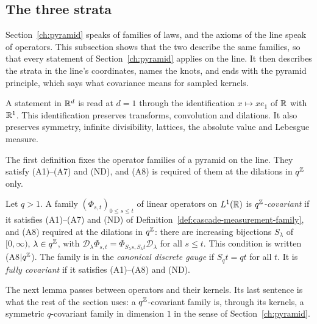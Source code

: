 \subsection{The three strata}
\label{subsec:line-strata}

Section~\ref{ch:pyramid} speaks of families of laws, and the axioms of the line speak of operators.
This subsection shows that the two describe the same families, so that every statement of
Section~\ref{ch:pyramid} applies on the line. It then describes the strata in the line's \Levy{}
coordinates, names the knots, and ends with the pyramid principle, which says what covariance means
for sampled kernels.

A statement in $\mathbb{R}^d$ is read at $d = 1$ through the identification $x \mapsto xe_1$ of $\mathbb{R}$ with
$\mathbb{R}^1$. This identification preserves transforms, convolution and dilations. It also preserves
symmetry, infinite divisibility, lattices, the absolute value and Lebesgue measure.

The first definition fixes the operator families of a pyramid on the line. They satisfy (A1)--(A7)
and (ND), and (A8) is required of them at the dilations in $q^{\mathbb{Z}}$ only.

\begin{definition}
\label{def:q-covariant-line}

Let $q > 1$. A family $(\Phi_{s,t})_{0 \le s \le t}$ of linear operators on $L^1(\mathbb{R})$ is
\emph{$q^{\mathbb{Z}}$-covariant} if it satisfies (A1)--(A7) and (ND) of
Definition~\ref{def:cascade-measurement-family}, and (A8) required at the dilations in $q^{\mathbb{Z}}$:
there are increasing bijections $S_\lambda$ of $[0,\infty)$, $\lambda \in q^{\mathbb{Z}}$, with
$\mathcal{D}_\lambda\Phi_{s,t} = \Phi_{S_\lambda s, S_\lambda t}\mathcal{D}_\lambda$ for all
$s \le t$. This condition is written (A8$|q^{\mathbb{Z}}$). The family is in the \emph{canonical
discrete gauge} if $S_qt = qt$ for all $t$. It is \emph{fully covariant} if it satisfies
(A1)--(A8) and (ND).
\end{definition}

The next lemma passes between operators and their kernels. Its last sentence is what the rest of the
section uses: a $q^{\mathbb{Z}}$-covariant family is, through its kernels, a symmetric $q$-covariant family
in dimension $1$ in the sense of Section~\ref{ch:pyramid}.


